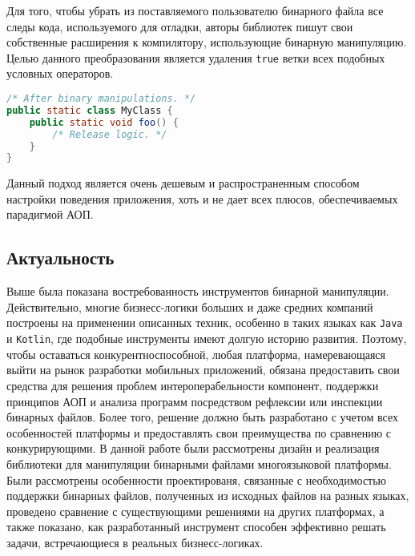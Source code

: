 Для того, чтобы убрать из поставляемого пользователю бинарного файла все следы кода, используемого для отладки, авторы библиотек пишут свои собственные расширения к компилятору, использующие бинарную манипуляцию. Целью данного преобразования является удаления \texttt{true} ветки всех подобных условных операторов.

\begin{lstlisting}[language=Java, caption=Результат работы преобразования, label=lst:debug]
/* After binary manipulations. */
public static class MyClass {
    public static void foo() {
        /* Release logic. */
    }
}
\end{lstlisting}

Данный подход является очень дешевым и распространенным способом настройки поведения приложения, хоть и не дает всех плюсов, обеспечиваемых парадигмой АОП.

\subsection{Актуальность}

Выше была показана востребованность инструментов бинарной манипуляции. Действительно, многие бизнесс-логики больших и даже средних компаний построены на применении описанных техник, особенно в таких языках как \texttt{Java} и \texttt{Kotlin}, где подобные инструменты имеют долгую историю развития. Поэтому, чтобы оставаться конкурентноспособной, любая платформа, намеревающаяся выйти на рынок разработки мобильных приложений, обязана предоставить свои средства для решения проблем интероперабельности компонент, поддержки принципов АОП и анализа программ посредством рефлексии или инспекции бинарных файлов. Более того, решение должно быть разработано с учетом всех особенностей платформы и предоставлять свои преимущества по сравнению с конкурирующими. В данной работе были рассмотрены дизайн и реализация библиотеки для манипуляции бинарными файлами многоязыковой платформы. Были рассмотрены особенности проектированя, связанные с необходимостью поддержки бинарных файлов, полученных из исходных файлов на разных языках, проведено сравнение с существующими решениями на других платформах, а также показано, как разработанный инструмент способен эффективно решать задачи, встречающиеся в реальных бизнесс-логиках.

\newpage
